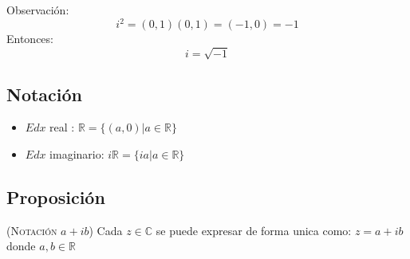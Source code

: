 Observación:
\[
  i^2 = (0,1)(0,1) = (-1,0) = -1
\]
Entonces:
\[
  i = \sqrt{-1}
\]

\subsection*{Notación}
\begin{itemize}
  \item $Edx$ real : $\mathbb{R}=\{(a,0) | a \in \mathbb{R}\}$
  \item $Edx$ imaginario: $i\mathbb{R} = \{ia | a \in \mathbb{R}\}$
\end{itemize}

\subsection*{Proposición}
\textsc{(Notación $a+ib$)} Cada $z \in \mathbb{C}$ se puede expresar de forma unica como: $z=a+ib$ donde $a,b \in \mathbb{R}$

